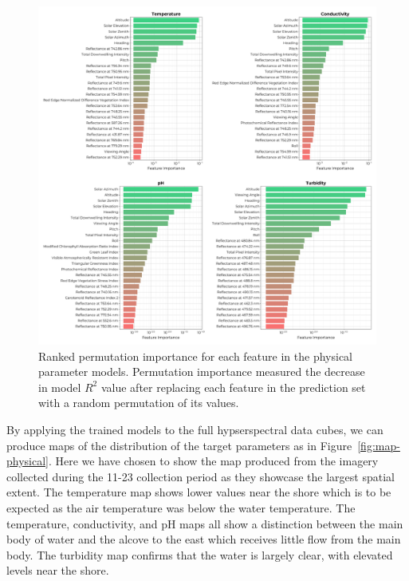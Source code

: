 \documentclass[sensors,article,submit,pdftex,moreauthors]{Definitions/mdpi}
\begin{document}
\begin{figure}
\centering
\includegraphics[width=\columnwidth]{paper/figures/results/fits/physical-ranking.pdf}
\caption{Ranked permutation importance for each feature in the physical parameter models. Permutation importance measured the decrease in model $R^2$ value after replacing each feature in the prediction set with a random permutation of its values.\label{fig:physical-fi}}
\end{figure}  

By applying the trained models to the full hypserspectral data cubes, we can produce maps of the distribution of the target parameters as in Figure~\ref{fig:map-physical}. Here we have chosen to show the map produced from the imagery collected during the 11-23 collection period as they showcase the largest spatial extent. The temperature map shows lower values near the shore which is to be expected as the air temperature was below the water temperature. The temperature, conductivity, and pH maps all show a distinction between the main body of water and the alcove to the east which receives little flow from the main body. The turbidity map confirms that the water is largely clear, with elevated levels near the shore.
\end{document}
